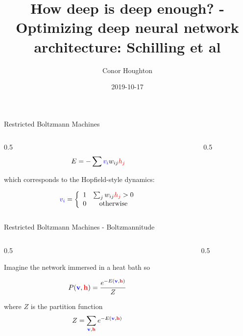 \documentclass{beamer}
\title[How deep is deep]{How deep is deep enough? - Optimizing deep neural network architecture: Schilling et al}
\author{Conor Houghton}
\institute{deep reading journal club: 1811.01753}
\date{2019-10-17}
\newcommand{\vi}{\color{blue}v_i\color{black}}
\newcommand{\hj}{\color{red}h_j\color{black}}
\newcommand{\vbf}{\color{blue}\mathbf{v}\color{black}}
\newcommand{\hbf}{\color{red}\mathbf{h}\color{black}}
\begin{document}
\maketitle

\begin{frame}{Restricted Boltzmann Machines}

\def\layersep{2.5cm}

\begin{columns}
\begin{column}{0.5\textwidth}
$$
  E= - \sum \vi w_{ij}\hj
$$
  \color{reddish}
  \begin{flushleft}
which corresponds to the Hopfield-style dynamics:
\end{flushleft}
\color{black}

$$
  \vi=\left\{\begin{array}{cc}1&\sum_j w_{ij}\hj>0\\0&\mbox{otherwise}\end{array}\right.
  $$
\end{column}
\begin{column}{0.5\textwidth}
    \begin{center}  

    \end{center}
\end{column}
\end{columns}

\end{frame}


\begin{frame}{Restricted Boltzmann Machines - Boltzmannitude}

\def\layersep{2.5cm}

\begin{columns}
\begin{column}{0.5\textwidth}
  \color{reddish}
  \begin{flushleft}
Imagine the network immersed in a heat bath so
\end{flushleft}
\color{black}
$$
P(\vbf,\hbf)=\frac{e^{-E(\vbf,\hbf)}}{Z}
$$
\color{reddish}

where \color{black}$Z$\color{reddish}{} is the partition function\color{black}
  $$
Z=\sum_{\vbf,\hbf}e^{-E(\vbf,\hbf)}
$$
\end{column}
\begin{column}{0.5\textwidth}
\begin{center}  

\end{center}
\end{column}
\end{columns}

\end{frame}
\end{document}
